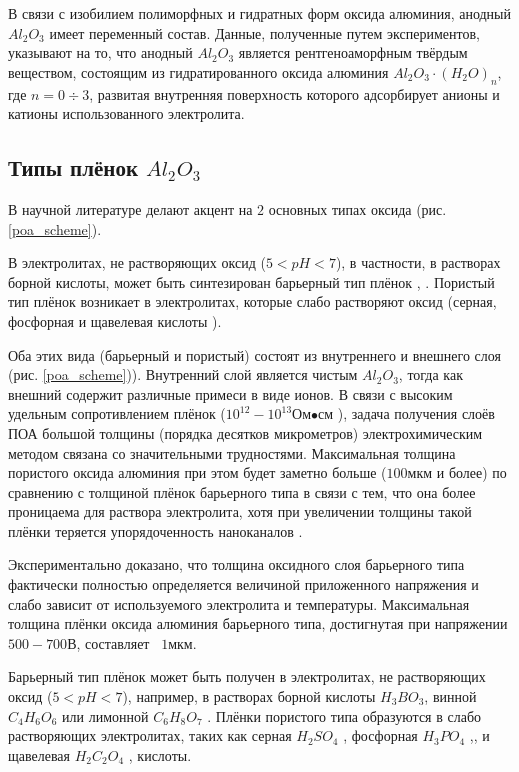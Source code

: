 В связи с изобилием полиморфных и гидратных форм оксида алюминия, анодный $Al_2O_3$ имеет переменный состав. Данные, полученные путем экспериментов, указывают на то, что анодный $Al_2O_3$ является рентгеноаморфным твёрдым веществом, состоящим из гидратированного оксида алюминия $Al_2O_3·(H_2O)_n$, где $n=0÷3$, развитая внутренняя поверхность которого адсорбирует анионы и катионы использованного электролита.

\subsection{Типы плёнок $Al_2O_3$}

В научной литературе делают акцент на $2$ основных типах оксида (рис. \ref{poa_scheme}).


В электролитах, не растворяющих оксид ($5 <pH <7$), в частности, в растворах борной кислоты, может быть синтезирован барьерный тип плёнок \cite{yakovleva-zakonomernosti}, \cite{viharev-osobennosti}. Пористый тип плёнок возникает в электролитах, которые слабо растворяют оксид (серная, фосфорная и щавелевая кислоты \cite{li_y}).

Оба этих вида (барьерный и пористый) состоят из внутреннего и внешнего слоя (рис. \ref{poa_scheme})). Внутренний слой является чистым $Al_2O_3$, тогда как внешний содержит различные примеси в виде ионов. В связи с высоким удельным сопротивлением плёнок ($10^{12}-10^{13} \text{Ом∙см}$ \cite{grilihes-pokrytiya}), задача получения слоёв ПОА большой толщины (порядка десятков микрометров) электрохимическим методом связана со значительными трудностями. Максимальная толщина пористого оксида алюминия при этом будет заметно больше ($100 \text{мкм}$ и более) по сравнению с толщиной плёнок барьерного типа в связи с тем, что она более проницаема для раствора электролита, хотя при увеличении толщины такой плёнки теряется упорядоченность наноканалов \cite{napolskiy-avtoref}.

Экспериментально доказано, что толщина оксидного слоя барьерного типа фактически полностью определяется величиной приложенного напряжения и слабо зависит от используемого электролита и температуры. Максимальная толщина плёнки оксида алюминия барьерного типа, достигнутая при напряжении $500 - 700 \text{В}$, составляет ~$1 \text{мкм}$.

Барьерный тип плёнок может быть получен в электролитах, не растворяющих оксид ($5 < pH < 7$), например, в растворах борной кислоты $H_3BO_3$, винной $C_4H_6O_6$ или лимонной $C_6H_8O_7$ \cite{varipaev-prakticum}. Плёнки пористого типа образуются в слабо растворяющих электролитах, таких как серная $H_2SO_4$  \cite{yang-influence}, фосфорная $H_3PO_4$ \cite{mombello},\cite{wang-analysis},\cite{coz-analysis} и щавелевая $H_2C_2O_4$ \cite{grigoryev-2d},\cite{jaafar-alumina} кислоты.

